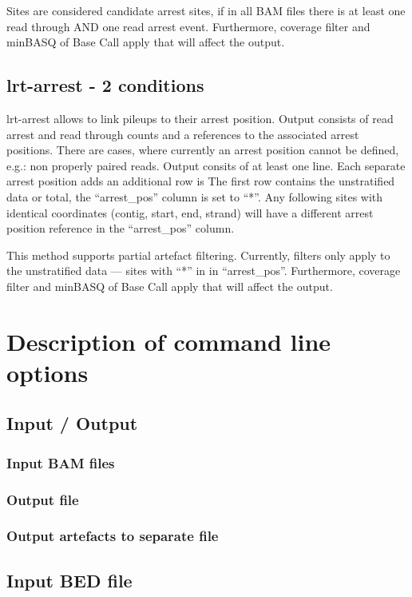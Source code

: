 \documentclass[10pt,a4paper]{article} \usepackage[utf8]{inputenc}
\begin{document}
Sites are considered candidate arrest sites, if in all BAM files there is at least one read through AND one  
read arrest event. Furthermore, coverage filter and minBASQ of Base Call apply that will affect the output. 
\subsection{lrt-arrest - 2 conditions}
lrt-arrest allows to link pileups to their arrest position. Output consists of read arrest and read through counts and 
a references to the associated arrest positions. There are cases, where currently an arrest position cannot be defined, 
e.g.: non properly paired reads.
Output consits of at least one line. Each separate arrest position adds an additional row is 
The first row contains the unstratified data or total, the ``arrest\_pos'' column is set to ``*''.
Any following sites with identical coordinates (contig, start, end, strand) will have a different 
arrest position reference in the ``arrest\_pos'' column. 

This method supports partial artefact filtering. Currently, filters only apply to the unstratified data --- 
sites with ``*'' in in ``arrest\_pos''. Furthermore, coverage filter and minBASQ of Base Call apply 
that will affect the output.
\section{Description of command line options}
\subsection{Input / Output}
\subsubsection{Input BAM files}
\subsubsection{Output file}

%
\subsubsection{Output artefacts to separate file}

%
\subsection{Input BED file}

\end{document}
